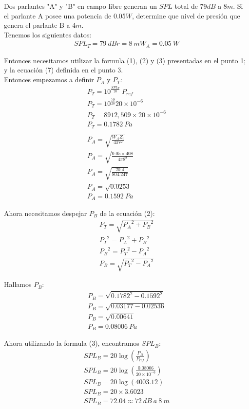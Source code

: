 \documentclass{article}
\begin{document}
Dos parlantes "A" y "B" en campo libre generan un $SPL$ total de 79$dB$ a 8$m$. Si el parlante A posee una potencia de 0.05$W$, determine que nivel de presión que genera el parlante B a 4$m$.\\

Tenemos los siguientes datos:
\begin{gather*}
    SPL_T = 79\ dB
    r = 8\ m
    W_A = 0.05\ W
\end{gather*}

Entonces necesitamos utilizar la formula (1), (2) y (3) presentadas en el punto 1; y la ecuación (7) definida en el punto 3.\\

Entonces empezamos a definir $P_A$ y $P_T$:
\begin{gather*}
    P_T = 10^\frac{SPL_T}{20}\ P_{ref}\\
    P_T = 10^\frac{79}{20} 20 \times 10^{-6}\\
    P_T = 8912,509 \times 20 \times 10^{-6}\\
    P_T = 0.1782\ Pa\\\\
    P_A = \sqrt{\frac{W_AZ_c}{4\pi r^2}}\\
    P_A = \sqrt{\frac{0.05 \times 408}{4\pi 8^2}}\\
    P_A = \sqrt{\frac{20.4}{804.247}}\\
    P_A = \sqrt{0.0253}\\
    P_A = 0.1592\ Pa
\end{gather*}

Ahora necesitamos despejar $P_B$ de la ecuación (2):
\begin{gather*}
    P_T = \sqrt{{P_A}^2 + {P_B}^2}\\
    {P_T}^2 = {P_A}^2 + {P_B}^2\\
    {P_B}^2 = {P_T}^2 - {P_A}^2\\
    P_B = \sqrt{{P_T}^2 - {P_A}^2}
\end{gather*}

Hallamos $P_B$:
\begin{gather*}
    P_B = \sqrt{{0.1782}^2 - {0.1592}^2}\\
    P_B = \sqrt{0.03177 - 0.02536}\\
    P_B = \sqrt{0.00641}\\
    P_B = 0.08006\ Pa
\end{gather*}

Ahora utilizando la formula (3), encontramos $SPL_B$:
\begin{gather*}
    SPL_B = 20 \log(\frac{P_B}{P_{ref}})\\
    SPL_B = 20 \log(\frac{0.08006}{20 \times 10^{-6}})\\
    SPL_B = 20 \log(4003.12)\\
    SPL_B = 20 \times 3.6023\\
    SPL_B = 72.04 \approx 72\ dB\ a\ 8\ m
\end{gather*}
\end{document}
